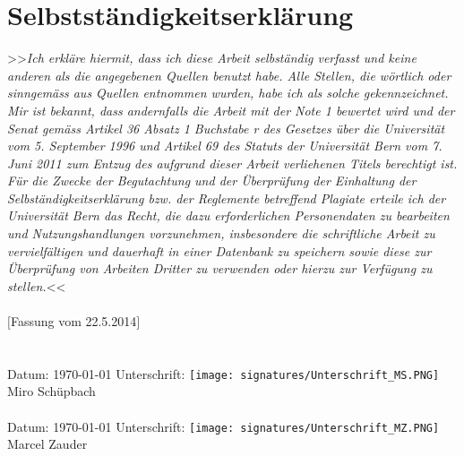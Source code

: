 \documentclass[a4paper,12pt]{report}
\begin{document}
	\chapter*{Selbstständigkeitserklärung}
	>>\textit{Ich erkläre hiermit, dass ich diese Arbeit selbständig verfasst und keine anderen als die angegebenen Quellen benutzt habe. Alle Stellen, die wörtlich oder sinngemäss aus Quellen entnommen wurden, habe ich als solche gekennzeichnet. Mir ist bekannt, dass andernfalls die Arbeit mit der Note 1 bewertet wird und der Senat gemäss Artikel 36 Absatz 1 Buchstabe r des Gesetzes über die Universität vom 5. September 1996 und Artikel 69 des Statuts der Universität Bern vom 7. Juni 2011 zum Entzug des aufgrund dieser Arbeit verliehenen Titels berechtigt ist. Für die Zwecke der Begutachtung und der Überprüfung der Einhaltung der Selbständigkeitserklärung bzw. der Reglemente betreffend Plagiate erteile ich der Universität Bern das Recht, die dazu erforderlichen Personendaten zu bearbeiten und Nutzungshandlungen vorzunehmen, insbesondere die schriftliche Arbeit zu vervielfältigen und dauerhaft in einer Datenbank zu speichern sowie diese zur Überprüfung von Arbeiten Dritter zu verwenden oder hierzu zur Verfügung zu stellen.}<< \\ \\
	$[$Fassung vom 22.5.2014$]$ \\ \\ \\
	Datum: \today \hspace{6cm} Unterschrift: \texttt{[image: signatures/Unterschrift\_MS.PNG]} \\
	\hspace*{12.75cm} \footnotesize Miro Schüpbach \\ \\
	\normalsize 
	Datum: \today \hspace{6cm} Unterschrift: \texttt{[image: signatures/Unterschrift\_MZ.PNG]} \\
	\hspace*{12.75cm} \footnotesize Marcel Zauder
	
\end{document}
